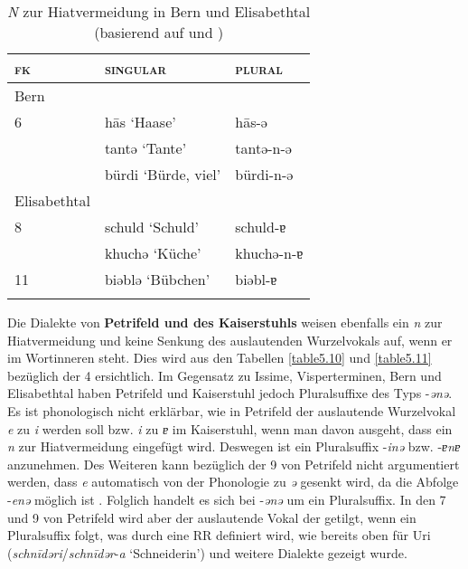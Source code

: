 \begin{table}
\caption{\textit{N} zur Hiatvermeidung in Bern und Elisabethtal (basierend auf \citealt[82-90]{Marti1985} und \citealt[50-52]{Žirmunskij1928/29})}\label{table5.9}
\begin{tabular}{lll} 
\lsptoprule
\textsc{fk} & \textsc{singular} & \textsc{plural}\\
\midrule
Bern &  & \\\midrule
6 & h\=as ‘Haase’ & h\=as-ə\\
& tantə ‘Tante’ & tantə-n-ə\\
& bürdi ‘Bürde, viel’ & bürdi-n-ə\\
\midrule
Elisabethtal &  & \\\midrule
8 & schuld ‘Schuld’ & schuld-ɐ\\
& khuchə ‘Küche’ & khuchə-n-ɐ\\
11 & biəblə ‘Bübchen’ & biəbl-ɐ\\
\lspbottomrule
\end{tabular}
\end{table}

Die Dialekte von \textbf{Petrifeld und des Kaiserstuhls} weisen ebenfalls ein \textit{n} zur Hiatvermeidung und keine Senkung des auslautenden Wurzelvokals auf, wenn er im Wortinneren steht. Dies wird aus den Tabellen \ref{table5.10} und \ref{table5.11} bezüglich der  4 ersichtlich. Im Gegensatz zu Issime, Visperterminen, Bern und Elisabethtal haben Petrifeld und Kaiserstuhl jedoch Pluralsuffixe des Typs -\textit{ənə}. Es ist phonologisch nicht erklärbar, wie in Petrifeld der auslautende Wurzelvokal \textit{e} zu \textit{i} werden soll bzw. \textit{i} zu \textit{ɐ} im Kaiserstuhl, wenn man davon ausgeht, dass ein \textit{n} zur Hiatvermeidung eingefügt wird. Deswegen ist ein Pluralsuffix -\textit{inə} bzw. -\textit{ɐnɐ} anzunehmen. Des Weiteren kann bezüglich der  9 von Petrifeld nicht argumentiert werden, dass \textit{e} automatisch von der Phonologie zu \textit{ə} gesenkt wird, da die Abfolge -\textit{enə} möglich ist \citep[42]{Moser1937}. Folglich handelt es sich bei -\textit{ənə} um ein Pluralsuffix. In den  7 und 9 von Petrifeld wird aber der auslautende Vokal der  getilgt, wenn ein Pluralsuffix folgt, was durch eine RR definiert wird, wie bereits oben für Uri (\textit{schn\=idəri}/\textit{schn\=idər}-\textit{a} ‘Schneiderin’) und weitere Dialekte gezeigt wurde.


